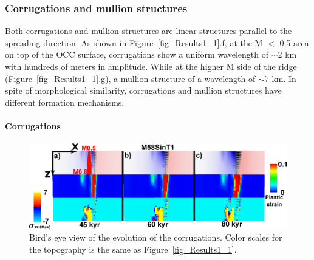 
\subsubsection{Corrugations and mullion structures}

Both corrugations and mullion structures are linear structures parallel to the spreading direction. As shown in Figure~\hyperref[fig_Results1_1]{\ref{fig_Results1_1}.f}, at the M $<$ 0.5 area on top of the OCC surface, corrugations show a uniform wavelength of $\sim$2 km with hundreds of meters in amplitude. While at the higher M side of the ridge (Figure~\hyperref[fig_Results1_1]{\ref{fig_Results1_1}.g}), a mullion structure of a wavelength of $\sim$7 km. In spite of morphological similarity, corrugations and mullion structures have different formation mechanisms. 

\paragraph{Corrugations}

\begin{figure}[h]
  \centering
    \includegraphics[width=1.0\textwidth]{./Figures/fig_Results_3_2_6_corrugations_evolution.eps}
  \caption{Bird's eye view of the evolution of the corrugations. Color scales for the topography is the same as Figure~\hyperref[fig_Results1_1]{\ref{fig_Results1_1}}.}
 \label{fig_Results_3_2_6_corrugations_evolution}
\end{figure}

